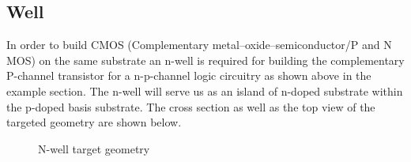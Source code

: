 \subsection{Well}
In order to build CMOS (Complementary metal–oxide–semiconductor/P and N MOS) on the same substrate an n-well is required for building the complementary P-channel transistor for a n-p-channel logic circuitry as shown above in the example section.
The n-well will serve us as an island of n-doped substrate within the p-doped basis substrate.
The cross section as well as the top view of the targeted geometry are shown below.
\begin{center}
	\begin{figure}[h]
		\begin{center}
			\begin{tikzpicture}[node distance = 3cm, auto, thick,scale=0.3, every node/.style={transform shape}]
				
			\end{tikzpicture}
			\begin{tikzpicture}[node distance = 3cm, auto, thick,scale=0.3, every node/.style={transform shape}]
				
			\end{tikzpicture}
		\end{center}
		\caption{N-well target geometry}
	\end{figure}
\end{center}

